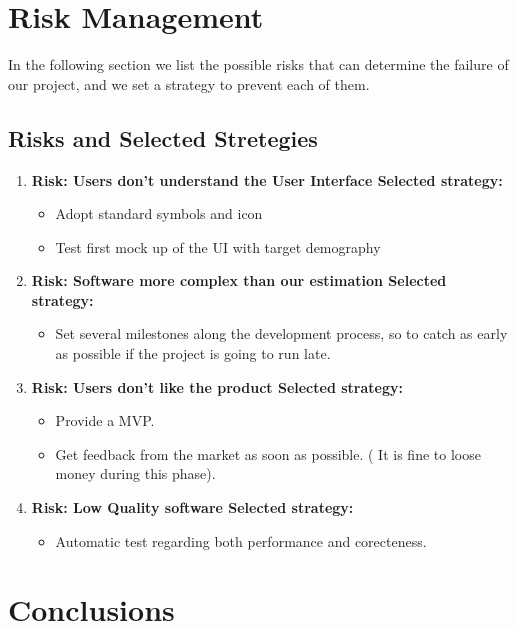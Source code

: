 \documentclass[11pt]{article} %
\newcommand{\risk}[2]{  \textbf{Risk: #1 \newline Selected strategy:}	#2 }
\begin{document}
\newpage
\section{Risk Management}

In the following section we list the possible risks that can determine the failure of our project, and we set a strategy to prevent each of them.

\subsection{Risks and Selected Stretegies}

\begin{enumerate}
	\item  \risk{ Users don't understand the User Interface}
			{\begin{itemize}[noitemsep, nolistsep]
				\item Adopt standard symbols and icon
				\item Test first mock up of the UI with target demography
			\end{itemize} }
	\item  \risk{ Software more complex than our estimation}
			{\begin{itemize}[noitemsep, nolistsep]
				\item Set several milestones along the development process, so to catch as early as possible if the project is going to run late. 
			\end{itemize} }
	\item  \risk{ Users don't like the product}
			{\begin{itemize}[noitemsep, nolistsep]	
				\item Provide a MVP.
				\item Get feedback from the market as soon as possible. \newline( It is fine to loose money during this phase).
			\end{itemize} }
	\item  \risk{ Low Quality software}
			{\begin{itemize}[noitemsep, nolistsep]
				\item Automatic test regarding both performance and corecteness.
			\end{itemize} }
\end{enumerate}





\newpage
\section{Conclusions}
\end{document}
